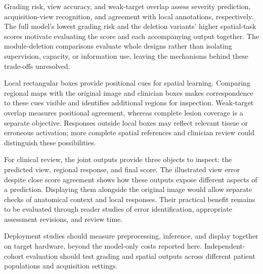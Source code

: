 Grading risk, view accuracy, and weak-target overlap assess severity prediction, acquisition-view recognition, and agreement with local annotations, respectively. The full model's lowest grading risk and the deletion variants' higher spatial-task scores motivate evaluating the score and each accompanying output together. The module-deletion comparisons evaluate whole designs rather than isolating supervision, capacity, or information use, leaving the mechanisms behind these trade-offs unresolved.

Local rectangular boxes provide positional cues for spatial learning. Comparing regional maps with the original image and clinician boxes makes correspondence to these cues visible and identifies additional regions for inspection. Weak-target overlap measures positional agreement, whereas complete lesion coverage is a separate objective. Responses outside local boxes may reflect relevant tissue or erroneous activation; more complete spatial references and clinician review could distinguish these possibilities.

For clinical review, the joint outputs provide three objects to inspect: the predicted view, regional response, and final score. The illustrated view error despite close score agreement shows how these outputs expose different aspects of a prediction. Displaying them alongside the original image would allow separate checks of anatomical context and local responses. Their practical benefit remains to be evaluated through reader studies of error identification, appropriate assessment revisions, and review time.

Deployment studies should measure preprocessing, inference, and display together on target hardware, beyond the model-only costs reported here. Independent-cohort evaluation should test grading and spatial outputs across different patient populations and acquisition settings.
